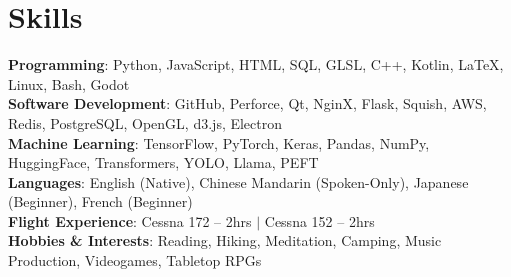 \section{Skills}
 \begin{itemize}[leftmargin=0.5cm, label={}]
    \small{\item{
     \textbf{Programming}{: Python, JavaScript, HTML, SQL, GLSL, C++, Kotlin, \LaTeX, Linux, Bash, Godot} \\\vspace{1pt}
     \textbf{Software Development}{: GitHub, Perforce, Qt, NginX, Flask, Squish, AWS, Redis, PostgreSQL, OpenGL, d3.js, Electron} \\\vspace{1pt}
     \textbf{Machine Learning}{: TensorFlow, PyTorch, Keras, Pandas, NumPy, HuggingFace, Transformers, YOLO, Llama, PEFT} \\\vspace{1pt}
     \textbf{Languages}{: English (Native), Chinese Mandarin (Spoken-Only), Japanese (Beginner), French (Beginner)} \\\vspace{1pt}
     \textbf{Flight Experience}{: Cessna 172 -- 2hrs $|$ Cessna 152 -- 2hrs} \\\vspace{1pt}
     \textbf{Hobbies \& Interests}{: Reading, Hiking, Meditation, Camping, Music Production, Videogames, Tabletop RPGs} \\\vspace{1pt}
    }}
 \end{itemize}